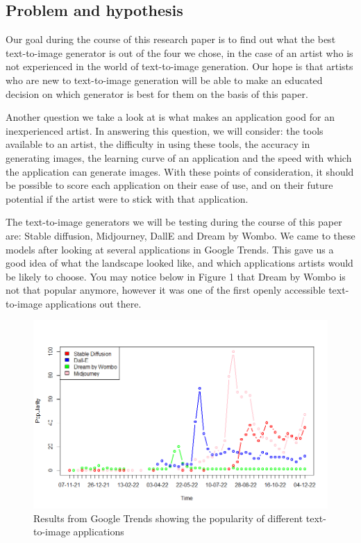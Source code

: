\documentclass[]{report}
\begin{document}
	\subsection{Problem and hypothesis}
	Our goal during the course of this research paper is to find out what the best text-to-image generator is out of the four we chose, in the case of an artist who is not experienced in the world of text-to-image generation. Our hope is that artists who are new to text-to-image generation will be able to make an educated decision on which generator is best for them on the basis of this paper.
	
	Another question we take a look at is what makes an application good for an inexperienced artist. In answering this question, we will consider: the tools available to an artist, the difficulty in using these tools, the accuracy in generating images, the learning curve of an application and the speed with which the application can generate images. With these points of consideration, it should be possible to score each application on their ease of use, and on their future potential if the artist were to stick with that application.
	
	The text-to-image generators we will be testing during the course of this paper are: Stable diffusion, Midjourney, DallE and Dream by Wombo. We came to these models after looking at several applications in Google Trends. \cite{googleTrends} This gave us a good idea of what the landscape looked like, and which applications artists would be likely to choose. You may notice below in Figure 1 that Dream by Wombo is not that popular anymore, however it was one of the first openly accessible text-to-image applications out there.
	
	\begin{figure}[!h]
		\centering
		\includegraphics[width=1\linewidth]{TrendsPlotWithLegend}
		\caption{Results from Google Trends showing the popularity of different text-to-image applications}
		\label{fig:TrendsPlotWithLegend}
	\end{figure}
	
\end{document}
